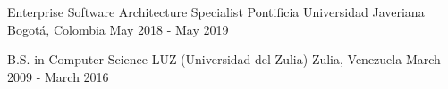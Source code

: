 \begin{cventries}
    \cventry
	{Enterprise Software Architecture Specialist}
	{Pontificia Universidad Javeriana}
	{Bogotá, Colombia}
	{May 2018 - May 2019}
	{}
	
	
  \cventry
    {B.S. in Computer Science}
    {LUZ (Universidad del Zulia)}
    {Zulia, Venezuela}
    {March 2009 - March 2016}
    {}
\end{cventries}
